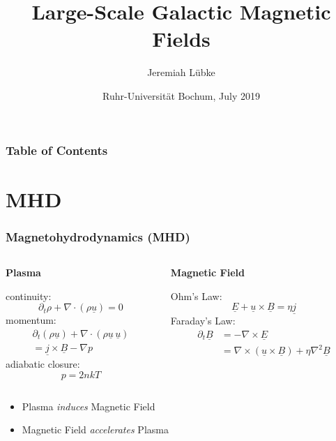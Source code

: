 \documentclass[mathserif]{beamer}
\title{Large-Scale Galactic Magnetic Fields}
\author{Jeremiah Lübke}
\date{Ruhr-Universität Bochum, July 2019}
\newcommand{\partt}{\partial_{t}}
\newcommand{\Div}{\nabla\cdot}
\newcommand{\Grad}{\nabla}
\newcommand{\Curl}{\nabla\times}
\newcommand{\Lap}{\nabla^{2}}
\newcommand{\uvec}{\underline{u}}
\newcommand{\jvec}{\underline{j}}
\newcommand{\Bvec}{\underline{B}}
\newcommand{\Evec}{\underline{E}}
\begin{document}
\setlength{\abovedisplayskip}{6pt}
\setlength{\belowdisplayskip}{6pt}


\frame{\titlepage}

\begin{frame}
    \frametitle{Table of Contents}
    \tableofcontents
\end{frame}


\addtocounter{framenumber}{-2}


\section{MHD}
\begin{frame}
    \frametitle{Magnetohydrodynamics (MHD)}
    \begin{columns}[T]
        \begin{column}[T]{.5\textwidth}
            \begin{tcolorbox}
            \begin{center}
                \textbf{Plasma}
            \end{center}
            continuity: \[\partt\rho+\Div(\rho\uvec)=0\]
            momentum:
            \begin{align*}
                \partt(\rho\uvec)+\Div(\rho\uvec\,\uvec) \\
                =\jvec\times\Bvec-\Grad{p}
            \end{align*}
            adiabatic closure: \[p=2nkT\]
            \end{tcolorbox}
        \end{column}

        \begin{column}[T]{.5\textwidth}
            \begin{tcolorbox}
            \begin{center}
                \textbf{Magnetic Field}
            \end{center}
            Ohm's Law: \[\Evec+\uvec\times\Bvec=\eta\jvec\]
            Faraday's Law:
            \begin{align*}
                \partt\Bvec&=-\Curl\Evec \\
                &=\Curl(\uvec\times\Bvec)+\eta\Lap\Bvec
            \end{align*}
            \end{tcolorbox}
        \end{column}
    \end{columns}
    \medskip
    \begin{itemize}
        \item Plasma \emph{induces} Magnetic Field
        \item Magnetic Field \emph{accelerates} Plasma
    \end{itemize}
\end{frame}
\end{document}
